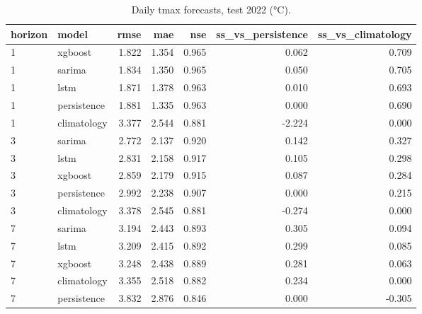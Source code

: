 \begin{table}[t]
\centering
\caption{Daily tmax forecasts, test 2022 (°C).}
\label{tab:daily_tmax}
\begin{tabular}{llrrrrr}
\toprule
horizon & model & rmse & mae & nse & ss\_vs\_persistence & ss\_vs\_climatology \\
\midrule
1 & xgboost & 1.822 & 1.354 & 0.965 & 0.062 & 0.709 \\
1 & sarima & 1.834 & 1.350 & 0.965 & 0.050 & 0.705 \\
1 & lstm & 1.871 & 1.378 & 0.963 & 0.010 & 0.693 \\
1 & persistence & 1.881 & 1.335 & 0.963 & 0.000 & 0.690 \\
1 & climatology & 3.377 & 2.544 & 0.881 & -2.224 & 0.000 \\
3 & sarima & 2.772 & 2.137 & 0.920 & 0.142 & 0.327 \\
3 & lstm & 2.831 & 2.158 & 0.917 & 0.105 & 0.298 \\
3 & xgboost & 2.859 & 2.179 & 0.915 & 0.087 & 0.284 \\
3 & persistence & 2.992 & 2.238 & 0.907 & 0.000 & 0.215 \\
3 & climatology & 3.378 & 2.545 & 0.881 & -0.274 & 0.000 \\
7 & sarima & 3.194 & 2.443 & 0.893 & 0.305 & 0.094 \\
7 & lstm & 3.209 & 2.415 & 0.892 & 0.299 & 0.085 \\
7 & xgboost & 3.248 & 2.438 & 0.889 & 0.281 & 0.063 \\
7 & climatology & 3.355 & 2.518 & 0.882 & 0.234 & 0.000 \\
7 & persistence & 3.832 & 2.876 & 0.846 & 0.000 & -0.305 \\
\bottomrule
\end{tabular}
\end{table}